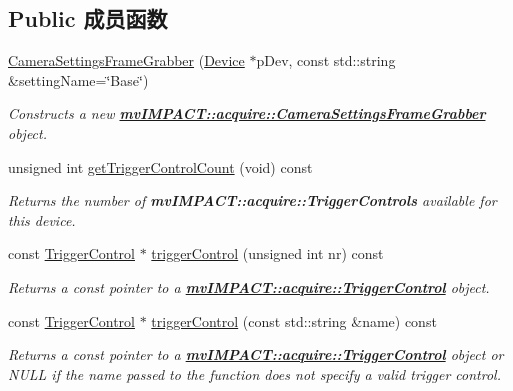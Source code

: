 \subsection*{Public 成员函数}
\begin{DoxyCompactItemize}
\item 
\hyperlink{classmv_i_m_p_a_c_t_1_1acquire_1_1_camera_settings_frame_grabber_a21e294f723493ea165c3cb2b414ba433}{Camera\+Settings\+Frame\+Grabber} (\hyperlink{classmv_i_m_p_a_c_t_1_1acquire_1_1_device}{Device} $\ast$p\+Dev, const std\+::string \&setting\+Name=\char`\"{}Base\char`\"{})
\begin{DoxyCompactList}\small\item\em Constructs a new {\bfseries \hyperlink{classmv_i_m_p_a_c_t_1_1acquire_1_1_camera_settings_frame_grabber}{mv\+I\+M\+P\+A\+C\+T\+::acquire\+::\+Camera\+Settings\+Frame\+Grabber}} object. \end{DoxyCompactList}\item 
unsigned int \hyperlink{classmv_i_m_p_a_c_t_1_1acquire_1_1_camera_settings_frame_grabber_ad3e291874c032126b28402539e949fb2}{get\+Trigger\+Control\+Count} (void) const 
\begin{DoxyCompactList}\small\item\em Returns the number of {\bfseries mv\+I\+M\+P\+A\+C\+T\+::acquire\+::\+Trigger\+Controls} available for this device. \end{DoxyCompactList}\item 
const \hyperlink{classmv_i_m_p_a_c_t_1_1acquire_1_1_trigger_control}{Trigger\+Control} $\ast$ \hyperlink{classmv_i_m_p_a_c_t_1_1acquire_1_1_camera_settings_frame_grabber_ab121b261beaf4db1e31116f372cfa227}{trigger\+Control} (unsigned int nr) const 
\begin{DoxyCompactList}\small\item\em Returns a const pointer to a {\bfseries \hyperlink{classmv_i_m_p_a_c_t_1_1acquire_1_1_trigger_control}{mv\+I\+M\+P\+A\+C\+T\+::acquire\+::\+Trigger\+Control}} object. \end{DoxyCompactList}\item 
const \hyperlink{classmv_i_m_p_a_c_t_1_1acquire_1_1_trigger_control}{Trigger\+Control} $\ast$ \hyperlink{classmv_i_m_p_a_c_t_1_1acquire_1_1_camera_settings_frame_grabber_a49074adbc4794944fd3cda354cdeb599}{trigger\+Control} (const std\+::string \&name) const 
\begin{DoxyCompactList}\small\item\em Returns a const pointer to a {\bfseries \hyperlink{classmv_i_m_p_a_c_t_1_1acquire_1_1_trigger_control}{mv\+I\+M\+P\+A\+C\+T\+::acquire\+::\+Trigger\+Control}} object or N\+U\+L\+L if the name passed to the function does not specify a valid trigger control. \end{DoxyCompactList}\end{DoxyCompactItemize}
